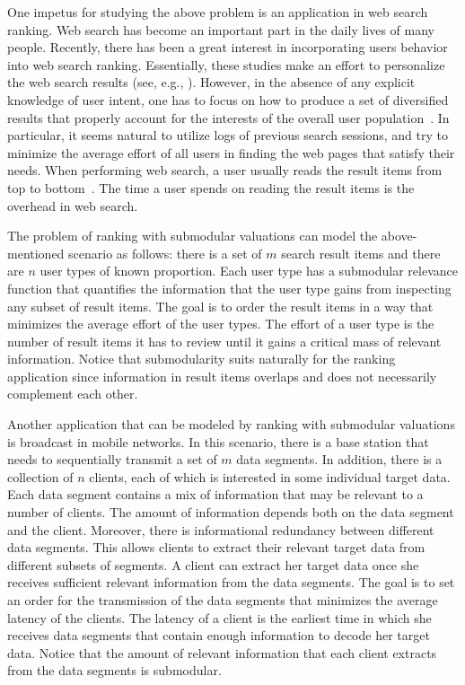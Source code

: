 \documentclass[11pt]{article}
\theoremstyle{plain}
\theoremstyle{definition}
\begin{document}
 One impetus for studying the
above problem is an application in web search ranking. Web search
has become an important part in the daily lives of many people.
Recently, there has been a great interest in incorporating users
behavior into web search ranking. Essentially, these studies make
an effort to personalize the web search results (see, e.g.,
\cite{TeevanDH05,AgichteinBD06,DouSW07,DupretP08}). However, in
the absence of any explicit knowledge of user intent, one has to
focus on how to produce a set of diversified results that properly
account for the interests of the overall user
population~\cite{ClarkeKCVABM08,AgrawalGHI09}. In particular, it
seems natural to utilize logs of previous search sessions, and try
to minimize the average effort of all users in finding the web
pages that satisfy their needs. When performing web search, a user
usually reads the result items from top to
bottom~\cite{JoachimsGPHRG07}. The time a user spends on reading
the result items is the overhead in web search.

The problem of ranking with submodular valuations can model the
above-mentioned scenario as follows: there is a set of $m$ search
result items and there are $n$ user types of known proportion.
Each user type has a submodular relevance function that quantifies
the information that the user type gains from inspecting any
subset of result items. The goal is to order the result items in a
way that minimizes the average effort of the user types. The
effort of a user type is the number of result items it has to
review until it gains a critical mass of relevant information.
Notice that submodularity suits naturally for the ranking
application since information in result items overlaps and does
not necessarily complement each other.

\smallskip {} Another
application that can be modeled by ranking with submodular
valuations is broadcast in mobile networks. In this scenario,
there is a base station that needs to sequentially transmit a set
of $m$ data segments. In addition, there is a collection of $n$
clients, each of which is interested in some individual target
data. Each data segment contains a mix of information that may be
relevant to a number of clients. The amount of information depends
both on the data segment and the client. Moreover, there is
informational redundancy between different data segments. This
allows clients to extract their relevant target data from
different subsets of segments. A client can extract her target
data once she receives sufficient relevant information from the
data segments. The goal is to set an order for the transmission of
the data segments that minimizes the average latency of the
clients. The latency of a client is the earliest time in which she
receives data segments that contain enough information to decode
her target data. Notice that the amount of relevant information
that each client extracts from the data segments is submodular.
\end{document}
